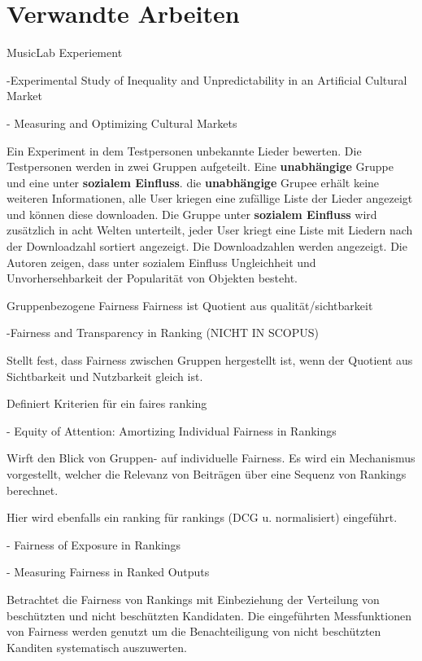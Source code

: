 \chapter{Verwandte Arbeiten}

MusicLab Experiement 

-Experimental Study of Inequality and Unpredictability in an Artificial Cultural Market


- Measuring and Optimizing Cultural Markets

Ein Experiment in dem Testpersonen unbekannte Lieder bewerten. Die Testpersonen werden in zwei Gruppen aufgeteilt. Eine \textbf{unabhängige} Gruppe und eine unter \textbf{sozialem Einfluss}. die \textbf{unabhängige} Grupee erhält keine weiteren Informationen, alle User kriegen eine zufällige Liste der Lieder angezeigt und können diese downloaden. Die Gruppe unter \textbf{sozialem Einfluss} wird zusätzlich in acht Welten unterteilt, jeder User kriegt eine Liste mit Liedern nach der Downloadzahl sortiert angezeigt. Die Downloadzahlen werden angezeigt. Die Autoren zeigen, dass unter sozialem Einfluss Ungleichheit und Unvorhersehbarkeit der Popularität von Objekten besteht.

Gruppenbezogene Fairness
Fairness ist Quotient aus qualität/sichtbarkeit


-Fairness and Transparency in Ranking (NICHT IN SCOPUS)

Stellt fest, dass Fairness zwischen Gruppen hergestellt ist, wenn der Quotient aus Sichtbarkeit und Nutzbarkeit gleich ist.

Definiert Kriterien für ein faires ranking

- Equity of Attention: Amortizing Individual Fairness in Rankings


Wirft den Blick von Gruppen- auf individuelle Fairness. Es wird ein Mechanismus vorgestellt, welcher die Relevanz von Beiträgen über eine Sequenz von Rankings berechnet. 

Hier wird ebenfalls ein ranking für rankings (DCG u. normalisiert) eingeführt.

- Fairness of Exposure in Rankings



- Measuring Fairness in Ranked Outputs


Betrachtet die Fairness von Rankings mit Einbeziehung der Verteilung von beschützten und nicht beschützten Kandidaten.
Die eingeführten Messfunktionen von Fairness werden genutzt um die Benachteiligung von nicht beschützten Kanditen systematisch auszuwerten.

